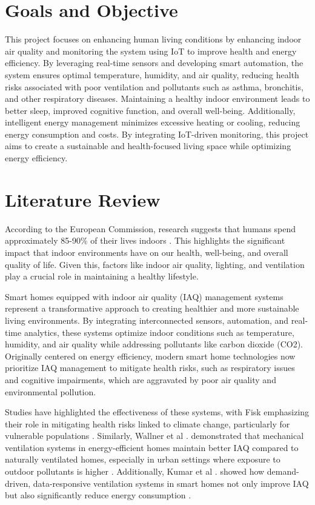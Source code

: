 \documentclass[a4paper]{scrartcl}
\begin{document}
\section{Goals and Objective}
This project focuses on enhancing human living conditions by enhancing indoor air quality and monitoring the system using IoT to improve health and energy efficiency. By leveraging real-time sensors and developing smart automation, the system ensures optimal temperature, humidity, and air quality, reducing health risks associated with poor ventilation and pollutants such as asthma, bronchitis, and other respiratory diseases. Maintaining a healthy indoor environment leads to better sleep, improved cognitive function, and overall well-being. Additionally, intelligent energy management minimizes excessive heating or cooling, reducing energy consumption and costs. By integrating IoT-driven monitoring, this project aims to create a sustainable and health-focused living space while optimizing energy efficiency.

\section{Literature Review}
According to the European Commission, research suggests that humans spend approximately 85-90\% of their lives indoors \cite{r19}. This highlights the significant impact that indoor environments have on our health, well-being, and overall quality of life. Given this, factors like indoor air quality, lighting, and ventilation play a crucial role in maintaining a healthy lifestyle.

Smart homes equipped with indoor air quality (IAQ) management systems represent a transformative approach to creating healthier and more sustainable living environments. By integrating interconnected sensors, automation, and real-time analytics, these systems optimize indoor conditions such as temperature, humidity, and air quality while addressing pollutants like carbon dioxide (CO2). Originally centered on energy efficiency, modern smart home technologies now prioritize IAQ management to mitigate health risks, such as respiratory issues and cognitive impairments, which are aggravated by poor air quality and environmental pollution.

Studies have highlighted the effectiveness of these systems, with Fisk emphasizing their role in mitigating health risks linked to climate change, particularly for vulnerable populations \cite{r14}. Similarly, Wallner et al \cite{r3}. demonstrated that mechanical ventilation systems in energy-efficient homes maintain better IAQ compared to naturally ventilated homes, especially in urban settings where exposure to outdoor pollutants is higher . Additionally, Kumar et al . showed how demand-driven, data-responsive ventilation systems in smart homes not only improve IAQ but also significantly reduce energy consumption \cite{r2}. 
\end{document}
